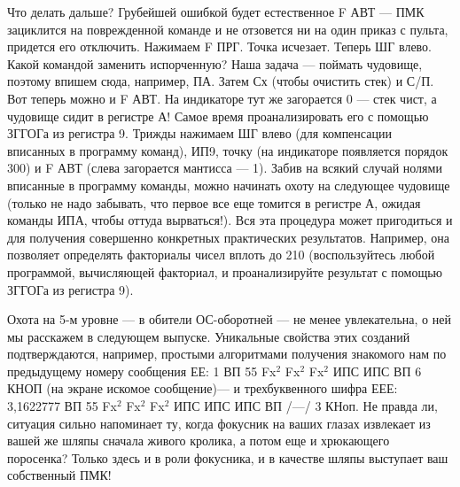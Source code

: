 \documentclass[11pt,a4paper,oneside]{article}
\begin{document}
Что делать дальше? Грубейшей ошибкой будет естественное F АВТ — ПМК зациклится на поврежденной команде и не отзовется ни на один приказ с пульта, придется его отключить. Нажимаем F ПРГ. Точка исчезает. Теперь ШГ влево. Какой командой заменить испорченную? Наша задача — поймать чудовище, поэтому впишем сюда, например, ПА. Затем Сх (чтобы очистить стек) и С/П. Вот теперь можно и F АВТ. На индикаторе тут же загорается 0 — стек чист, а чудовище сидит в регистре А! Самое время проанализировать его с помощью ЗГГОГа из регистра 9. Трижды нажимаем ШГ влево (для компенсации вписанных в программу команд), ИП9, точку (на индикаторе появляется порядок 300) и F АВТ (слева загорается мантисса — 1). Забив на всякий случай нолями вписанные в программу команды, можно начинать охоту на следующее чудовище (только не надо забывать, что первое все еще томится в регистре А, ожидая команды ИПА, чтобы оттуда вырваться!). Вся эта процедура может пригодиться и для получения совершенно конкретных практических результатов. Например, она позволяет определять факториалы чисел вплоть до 210 (воспользуйтесь любой программой, вычисляющей факториал, и проанализируйте результат с помощью ЗГГОГа из регистра 9).

Охота на 5-м уровне — в обители ОС-оборотней — не менее увлекательна, о ней мы расскажем в следующем выпуске. Уникальные свойства этих созданий подтверждаются, например, простыми алгоритмами получения знакомого нам по предыдущему номеру сообщения ЕЕ: 1 ВП 55 Fx$^{2}$ Fx$^{2}$ Fx$^{2}$ ИПС ИПС ВП 6 КНОП (на экране искомое сообщение)— и трехбуквенного шифра ЕЕЕ: 3,1622777 ВП 55 Fx$^{2}$ Fx$^{2}$ Fx$^{2}$ ИПС ИПС ИПС ВП /—/ 3 КНоп. Не правда ли, ситуация сильно напоминает ту, когда фокусник на ваших глазах извлекает из вашей же шляпы сначала живого кролика, а потом еще и хрюкающего поросенка? Только здесь и в роли фокусника, и в качестве шляпы выступает ваш собственный ПМК!
\end{document}
